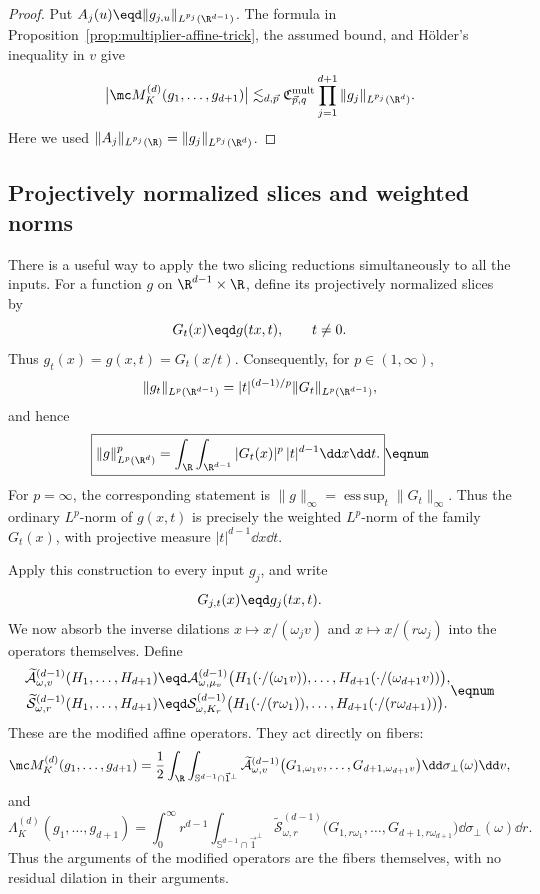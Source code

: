 \begin{proof}
Put $A_j(u)\eqd\|g_{j,u}\|_{L^{p_j}(\R^{d-1})}$.  The formula in
Proposition~\ref{prop:multiplier-affine-trick}, the assumed bound, and
H\"older's inequality in $v$ give
\[
  \bigl|\mc M_K^{(d)}(g_1,\ldots,g_{d+1})\bigr|
  \lesssim_{d,\vec p}
  \mathfrak C_{\vec p,q}^{\mathrm{mult}}
  \prod_{j=1}^{d+1}\|g_j\|_{L^{p_j}(\R^d)}.
\]
Here we used $\|A_j\|_{L^{p_j}(\R)}=\|g_j\|_{L^{p_j}(\R^d)}$.
\end{proof}

\subsection{Projectively normalized slices and weighted norms}

There is a useful way to apply the two slicing reductions simultaneously to
all the inputs.  For a function \(g\) on
\(\R^{d-1}\times\R\), define its projectively normalized slices by
\[
  G_t(x)\eqd g(tx,t),\qquad t\ne0.
\]
Thus \(g_t(x)=g(x,t)=G_t(x/t)\).  Consequently, for
\(p\in(1,\infty)\),
\[
  \|g_t\|_{L^p(\R^{d-1})}
  =|t|^{(d-1)/p}\|G_t\|_{L^p(\R^{d-1})},
\]
and hence
\[
  \boxed{
  \|g\|_{L^p(\R^d)}^p
  =\int_\R\int_{\R^{d-1}}|G_t(x)|^p\,
    |t|^{d-1}\dd x\dd t.}
  \eqnum \label{eq:projective-weighted-norm}
\]
For \(p=\infty\), the corresponding statement is
\(\|g\|_\infty=\operatorname*{ess\,sup}_t\|G_t\|_\infty\).  Thus the ordinary
\(L^p\)-norm of \(g(x,t)\) is precisely the weighted \(L^p\)-norm of the
family \(G_t(x)\), with projective measure
\(|t|^{d-1}\dd x\dd t\).

Apply this construction to every input \(g_j\), and write
\[
  G_{j,t}(x)\eqd g_j(tx,t).
\]
We now absorb the inverse dilations \(x\mapsto x/(\omega_jv)\) and
\(x\mapsto x/(r\omega_j)\) into the operators themselves.  Define
\[
\begin{aligned}
  \widetilde{\mathcal A}_{\omega,v}^{(d-1)}
  (H_1,\ldots,H_{d+1})
  &\eqd
  \mathcal A_{\omega,\mu_v}^{(d-1)}
  \bigl(
    H_1(\cdot/(\omega_1v)),\ldots,
    H_{d+1}(\cdot/(\omega_{d+1}v))
  \bigr),\\
  \widetilde{\mathcal S}_{\omega,r}^{(d-1)}
  (H_1,\ldots,H_{d+1})
  &\eqd
  \mathcal S_{\omega,K_r}^{(d-1)}
  \bigl(
    H_1(\cdot/(r\omega_1)),\ldots,
    H_{d+1}(\cdot/(r\omega_{d+1}))
  \bigr).
\end{aligned}
\eqnum \label{eq:modified-affine-operators}
\]
These are the modified affine operators.  They act directly on fibers:
\[
  \mc M_K^{(d)}(g_1,\ldots,g_{d+1})
  =\frac12\int_\R\int_{\mathbb S^{d-1}\cap\vec1^\perp}
  \widetilde{\mathcal A}_{\omega,v}^{(d-1)}
  \bigl(
    G_{1,\omega_1v},\ldots,G_{d+1,\omega_{d+1}v}
  \bigr)
  \dd\sigma_\perp(\omega)\dd v,
\]
and
\[
  \Lambda_K^{(d)}(g_1,\ldots,g_{d+1})
  =\int_0^\infty r^{d-1}
  \int_{\mathbb S^{d-1}\cap\vec1^\perp}
  \widetilde{\mathcal S}_{\omega,r}^{(d-1)}
  \bigl(
    G_{1,r\omega_1},\ldots,G_{d+1,r\omega_{d+1}}
  \bigr)
  \dd\sigma_\perp(\omega)\dd r.
\]
Thus the arguments of the modified operators are the fibers themselves,
with no residual dilation in their arguments.

